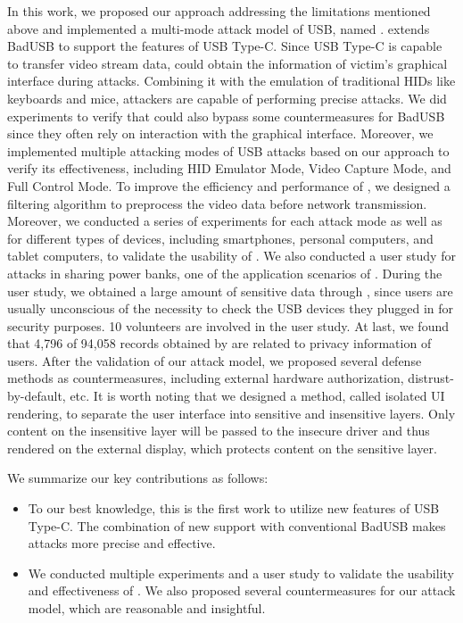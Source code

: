 In this work, we proposed our approach addressing the limitations mentioned
above and implemented a multi-mode attack model of \ac{USB}, named \tool.  \tool
extends BadUSB to support the features of \ac{USB} Type-C.  Since \ac{USB} Type-C is
capable to transfer video stream data, \tool could obtain the information of
victim's graphical interface during attacks.  Combining it with the emulation
of traditional \acp{HID} like keyboards and mice, attackers are capable of
performing precise attacks.  We did experiments to verify that \tool could also
bypass some countermeasures for BadUSB since they often rely on interaction
with the graphical interface.  Moreover, we implemented multiple attacking
modes of \ac{USB} attacks based on our approach to verify its effectiveness,
including \ac{HID} Emulator Mode, Video Capture Mode, and Full Control Mode.  To improve the
efficiency and performance of \tool, we designed a filtering algorithm to
preprocess the video data before network transmission.  Moreover, we conducted
a series of experiments for each attack mode as well as for different types of
devices, including smartphones, personal computers, and tablet computers, to
validate the usability of \tool.  We also conducted a user study for attacks in
sharing power banks, one of the application scenarios of \tool.  During the
user study, we obtained a large amount of sensitive data through \tool, since
users are usually unconscious of the necessity to check the \ac{USB} devices they
plugged in for security purposes.  
10 volunteers are involved in the user study.
At last, we found that 4,796 of 94,058 records obtained by \tool are related to privacy information of users.
After the validation of our attack model, we
proposed several defense methods as countermeasures, including external
hardware authorization, distrust-by-default, etc.  It is worth noting that we
designed a method, called isolated \ac{UI} rendering, to separate the user interface
into sensitive and insensitive layers.  Only content on the insensitive layer
will be passed to the insecure driver and thus rendered on the external
display, which protects content on the sensitive layer.

We summarize our key contributions as follows:

\begin{itemize} 
    
    \item To our best knowledge, this is the first work to utilize new features
	of \ac{USB} Type-C.  The combination of new support with conventional BadUSB
	makes attacks more precise and effective.
	
	
    \item We conducted multiple experiments and a user study to validate the
	usability and effectiveness of \tool.  We also proposed several
	countermeasures for our attack model, which are reasonable and
	insightful. 
\end{itemize}

